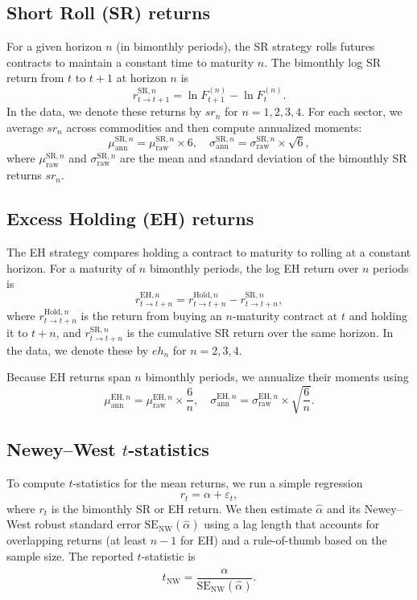 \documentclass[11pt]{article}
\begin{document}
\subsection*{Short Roll (SR) returns}

For a given horizon \(n\) (in bimonthly periods), the SR strategy rolls
futures contracts to maintain a constant time to maturity \(n\).
The bimonthly log SR return from \(t\) to \(t+1\) at horizon \(n\) is
\[
  r^{\text{SR},n}_{t \to t+1}
  = \ln F_{t+1}^{(n)} - \ln F_t^{(n)}.
\]
In the data, we denote these returns by \(sr_n\) for \(n = 1,2,3,4\).
For each sector, we average \(sr_n\) across commodities and then compute
annualized moments:
\[
  \mu_{\text{ann}}^{\text{SR},n}
  = \mu_{\text{raw}}^{\text{SR},n} \times 6, \quad
  \sigma_{\text{ann}}^{\text{SR},n}
  = \sigma_{\text{raw}}^{\text{SR},n} \times \sqrt{6},
\]
where \(\mu_{\text{raw}}^{\text{SR},n}\) and \(\sigma_{\text{raw}}^{\text{SR},n}\)
are the mean and standard deviation of the bimonthly SR returns \(sr_n\).

\subsection*{Excess Holding (EH) returns}

The EH strategy compares holding a contract to maturity to rolling at a
constant horizon.
For a maturity of \(n\) bimonthly periods, the log EH return over \(n\)
periods is
\[
  r^{\text{EH},n}_{t \to t+n}
  = r^{\text{Hold},n}_{t \to t+n}
    - r^{\text{SR},n}_{t \to t+n},
\]
where \(r^{\text{Hold},n}_{t \to t+n}\) is the return from buying an
\(n\)-maturity contract at \(t\) and holding it to \(t+n\), and
\(r^{\text{SR},n}_{t \to t+n}\) is the cumulative SR return over the same
horizon.
In the data, we denote these by \(eh_n\) for \(n = 2,3,4\).

Because EH returns span \(n\) bimonthly periods, we annualize their moments
using
\[
  \mu_{\text{ann}}^{\text{EH},n}
  = \mu_{\text{raw}}^{\text{EH},n} \times \frac{6}{n}, \quad
  \sigma_{\text{ann}}^{\text{EH},n}
  = \sigma_{\text{raw}}^{\text{EH},n} \times \sqrt{\frac{6}{n}}.
\]

\subsection*{Newey--West \(t\)-statistics}

To compute \(t\)-statistics for the mean returns, we run a simple regression
\[
  r_t = \alpha + \varepsilon_t,
\]
where \(r_t\) is the bimonthly SR or EH return.
We then estimate \(\hat{\alpha}\) and its Newey--West robust standard error
\(\text{SE}_{\text{NW}}(\hat{\alpha})\) using a lag length that accounts for
overlapping returns (at least \(n-1\) for EH) and a rule-of-thumb based on
the sample size.
The reported \(t\)-statistic is
\[
  t_{\text{NW}} = \frac{\hat{\alpha}}{\text{SE}_{\text{NW}}(\hat{\alpha})}.
\]
\end{document}
